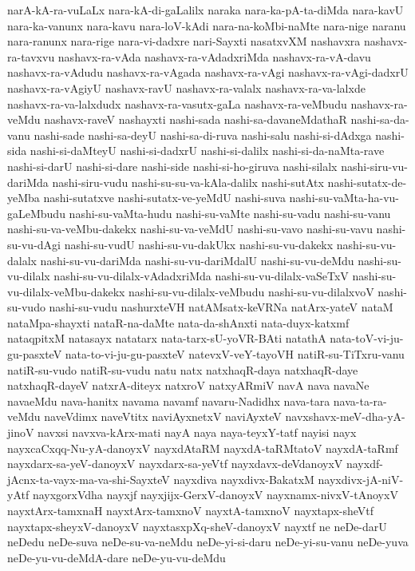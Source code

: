 {narA-kA-ra-vuLaLx
nara-kA-di-gaLalilx
naraka
nara-ka-pA-ta-diMda
nara-kavU
nara-ka-vanunx
nara-kavu
nara-loV-kAdi
nara-na-koMbi-naMte
nara-nige
naranu
nara-ranunx
nara-rige
nara-vi-dadxre
nari-Sayxti
nasatxvXM
nashavxra
nashavx-ra-tavxvu
nashavx-ra-vAda
nashavx-ra-vAdadxriMda
nashavx-ra-vA-davu
nashavx-ra-vAdudu
nashavx-ra-vAgada
nashavx-ra-vAgi
nashavx-ra-vAgi-dadxrU
nashavx-ra-vAgiyU
nashavx-ravU
nashavx-ra-valalx
nashavx-ra-va-lalxde
nashavx-ra-va-lalxdudx
nashavx-ra-vasutx-gaLa
nashavx-ra-veMbudu
nashavx-ra-veMdu
nashavx-raveV
nashayxti
nashi-sada
nashi-sa-davaneMdathaR
nashi-sa-da-vanu
nashi-sade
nashi-sa-deyU
nashi-sa-di-ruva
nashi-salu
nashi-si-dAdxga
nashi-sida
nashi-si-daMteyU
nashi-si-dadxrU
nashi-si-dalilx
nashi-si-da-naMta-rave
nashi-si-darU
nashi-si-dare
nashi-side
nashi-si-ho-giruva
nashi-silalx
nashi-siru-vu-dariMda
nashi-siru-vudu
nashi-su-su-va-kAla-dalilx
nashi-sutAtx
nashi-sutatx-de-yeMba
nashi-sutatxve
nashi-sutatx-ve-yeMdU
nashi-suva
nashi-su-vaMta-ha-vu-gaLeMbudu
nashi-su-vaMta-hudu
nashi-su-vaMte
nashi-su-vadu
nashi-su-vanu
nashi-su-va-veMbu-dakekx
nashi-su-va-veMdU
nashi-su-vavo
nashi-su-vavu
nashi-su-vu-dAgi
nashi-su-vudU
nashi-su-vu-dakUkx
nashi-su-vu-dakekx
nashi-su-vu-dalalx
nashi-su-vu-dariMda
nashi-su-vu-dariMdalU
nashi-su-vu-deMdu
nashi-su-vu-dilalx
nashi-su-vu-dilalx-vAdadxriMda
nashi-su-vu-dilalx-vaSeTxV
nashi-su-vu-dilalx-veMbu-dakekx
nashi-su-vu-dilalx-veMbudu
nashi-su-vu-dilalxvoV
nashi-su-vudo
nashi-su-vudu
nashurxteVH
natAMsatx-keVRNa
natArx-yateV
nataM
nataMpa-shayxti
nataR-na-daMte
nata-da-shAnxti
nata-duyx-katxmf
nataqpitxM
natasayx
natatarx
nata-tarx-sU-yoVR-BAti
natathA
nata-toV-vi-ju-gu-pasxteV
nata-to-vi-ju-gu-pasxteV
natevxV-veY-tayoVH
natiR-su-TiTxru-vanu
natiR-su-vudo
natiR-su-vudu
natu
natx
natxhaqR-daya
natxhaqR-daye
natxhaqR-dayeV
natxrA-diteyx
natxroV
natxyARmiV
navA
nava
navaNe
navaeMdu
nava-hanitx
navama
navamf
navaru-Nadidhx
nava-tara
nava-ta-ra-veMdu
naveVdimx
naveVtitx
naviAyxnetxV
naviAyxteV
navxshavx-meV-dha-yA-jinoV
navxsi
navxva-kArx-mati
nayA
naya
naya-teyxY-tatf
nayisi
nayx
nayxcaCxqq-Nu-yA-danoyxV
nayxdAtaRM
nayxdA-taRMtatoV
nayxdA-taRmf
nayxdarx-sa-yeV-danoyxV
nayxdarx-sa-yeVtf
nayxdavx-deVdanoyxV
nayxdf-jAcnx-ta-vayx-ma-va-shi-SayxteV
nayxdiva
nayxdivx-BakatxM
nayxdivx-jA-niV-yAtf
nayxgorxVdha
nayxjf
nayxjijx-GerxV-danoyxV
nayxnamx-nivxV-tAnoyxV
nayxtArx-tamxnaH
nayxtArx-tamxnoV
nayxtA-tamxnoV
nayxtapx-sheVtf
nayxtapx-sheyxV-danoyxV
nayxtasxpXq-sheV-danoyxV
nayxtf
ne
neDe-darU
neDedu
neDe-suva
neDe-su-va-neMdu
neDe-yi-si-daru
neDe-yi-su-vanu
neDe-yuva
neDe-yu-vu-deMdA-dare
neDe-yu-vu-deMdu
}
